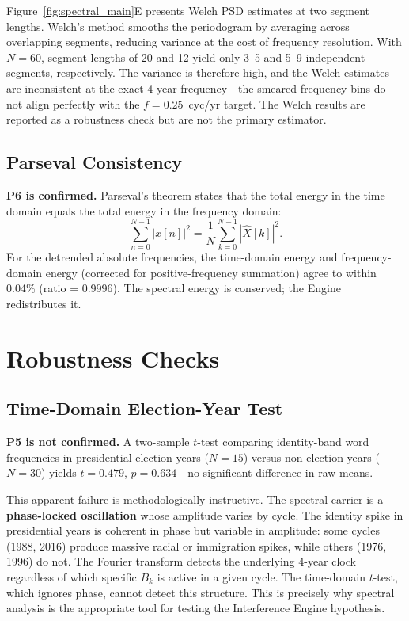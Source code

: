 Figure~\ref{fig:spectral_main}E presents Welch PSD estimates at two segment lengths. Welch's method smooths the periodogram by averaging across overlapping segments, reducing variance at the cost of frequency resolution. With $N = 60$, segment lengths of 20 and 12 yield only 3--5 and 5--9 independent segments, respectively. The variance is therefore high, and the Welch estimates are inconsistent at the exact 4-year frequency---the smeared frequency bins do not align perfectly with the $f = 0.25$~cyc/yr target. The Welch results are reported as a robustness check but are not the primary estimator.

\subsection{Parseval Consistency}

\textbf{P6 is confirmed.} Parseval's theorem states that the total energy in the time domain equals the total energy in the frequency domain:
\begin{equation}\label{eq:21.7-parseval}
\sum_{n=0}^{N-1} |x[n]|^2 = \frac{1}{N} \sum_{k=0}^{N-1} |\hat{X}[k]|^2.
\end{equation}
For the detrended absolute frequencies, the time-domain energy and frequency-domain energy (corrected for positive-frequency summation) agree to within 0.04\% (ratio = 0.9996). The spectral energy is conserved; the Engine redistributes it.

\section{Robustness Checks}

\subsection{Time-Domain Election-Year Test}

\textbf{P5 is not confirmed.} A two-sample $t$-test comparing identity-band word frequencies in presidential election years ($N = 15$) versus non-election years ($N = 30$) yields $t = 0.479$, $p = 0.634$---no significant difference in raw means.

This apparent failure is methodologically instructive. The spectral carrier is a \textbf{phase-locked oscillation} whose amplitude varies by cycle. The identity spike in presidential years is coherent in phase but variable in amplitude: some cycles (1988, 2016) produce massive racial or immigration spikes, while others (1976, 1996) do not. The Fourier transform detects the underlying 4-year clock regardless of which specific $B_k$ is active in a given cycle. The time-domain $t$-test, which ignores phase, cannot detect this structure. This is precisely why spectral analysis is the appropriate tool for testing the Interference Engine hypothesis.

